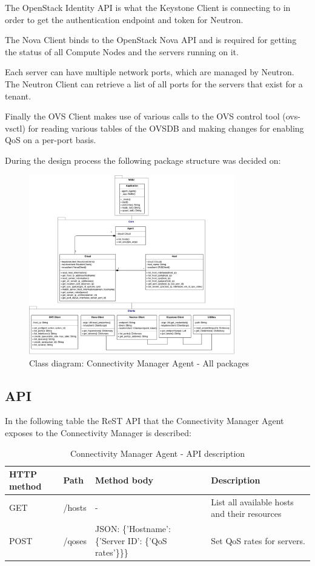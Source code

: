 The OpenStack Identity API is what the Keystone Client is connecting to in order to get the authentication endpoint and token for Neutron.

The Nova Client binds to the OpenStack Nova API and is required for getting the status of all Compute Nodes and the servers running on it.

Each server can have multiple network ports, which are managed by Neutron. The Neutron Client can retrieve a list of all ports for the servers that exist for a tenant.

Finally the OVS Client makes use of various calls to the OVS control tool (ovs-vsctl) for reading various tables of the OVSDB and making changes for enabling QoS on a per-port basis.

During the design process the following package structure was decided on:

\begin{figure}[H]
\centering

\includegraphics[width=0.8\textwidth]{images/design/cm_agent_class_diagram}

\caption{Class diagram: Connectivity Manager Agent - All packages}
\end{figure}


\subsection{API}

In the following table the ReST API that the Connectivity Manager Agent exposes to the Connectivity Manager is described:

\begin{table}[H]
\centering

\begin{tabularx}{\textwidth}{ |X|X|X|X| }
\hline HTTP method & Path & Method body & Description \\ 
\hline GET & /hosts & - & List all available hosts and their resources \\ 
\hline POST & /qoses & JSON: \{'Hostname': \{'Server ID': \{'QoS rates'\}\}\} & Set QoS rates for servers. \\ 
\hline 
\end{tabularx}

\caption{Connectivity Manager Agent - API description}
\end{table}


